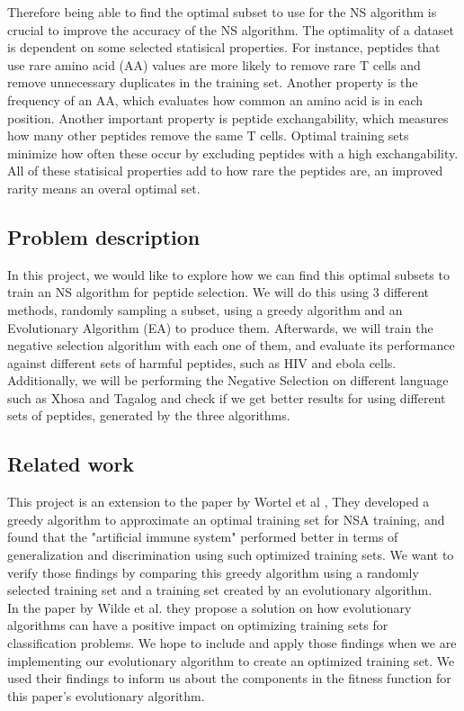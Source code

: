 \documentclass{article}
\begin{document}
Therefore being able to find the optimal subset to use for the NS algorithm is crucial to improve the accuracy of the 
NS algorithm. The optimality of a dataset is dependent on some selected statisical properties. For instance, peptides that use rare amino acid (AA) values are more likely to remove rare T cells and remove unnecessary duplicates in the training set. Another property is the frequency of an AA, which evaluates how common an amino acid is in each position. Another important property is peptide exchangability, which measures how many other peptides remove the same T cells. Optimal training sets minimize how often these occur by excluding peptides with a high exchangability. All of these statisical properties add to how rare the peptides are, an improved rarity means an overal optimal set.

\subsection{Problem description}

In this project, we would like to explore how we can find this optimal subsets to train an NS algorithm for peptide 
selection. We will do this using 3 different methods, randomly sampling a subset, using a greedy algorithm and an 
Evolutionary Algorithm (EA) to produce them. Afterwards, we will train the negative selection algorithm with each one of
them, and evaluate its performance against different sets of harmful peptides, such as HIV and ebola cells. Additionally,
we will be performing the Negative Selection on different language such as Xhosa and Tagalog and check if we get better 
results for using different sets of peptides, generated by the three algorithms. 

\subsection{Related work}
This project is an extension to the paper by Wortel et al \cite{wortel2020t}, They developed a greedy algorithm to 
approximate an optimal training set for NSA training, and found that the "artificial immune system" performed better in 
terms of generalization and discrimination using such optimized training sets. We want to verify those findings by 
comparing this greedy algorithm using a randomly selected training set and a training set created by an evolutionary 
algorithm.\\

In the paper by Wilde et al. \cite{wilde2020evolutionary} they propose a solution on how evolutionary algorithms can 
have a positive impact on optimizing training sets for classification problems.
We hope to include and apply those findings when we are implementing our evolutionary algorithm to create an 
optimized training set. We used their findings to inform us about the components in the fitness function for this paper's evolutionary algorithm.
\end{document}
